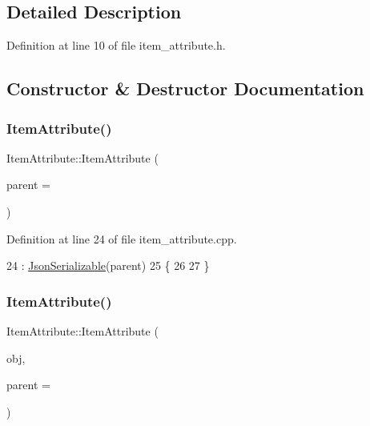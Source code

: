 \subsection{Detailed Description}


Definition at line 10 of file item\+\_\+attribute.\+h.



\subsection{Constructor \& Destructor Documentation}
\mbox{\label{class_item_attribute_a1245a8f1a5bd8e214a249bfadaf3a471}} 
\subsubsection{\texorpdfstring{Item\+Attribute()}{ItemAttribute()}\hspace{0.1cm}{\footnotesize\ttfamily [1/2]}}
{\footnotesize\ttfamily Item\+Attribute\+::\+Item\+Attribute (\begin{DoxyParamCaption}\item[{\hyperlink{class_item}{Item} $\ast$}]{parent = {} }\end{DoxyParamCaption})\hspace{0.3cm}{\ttfamily [explicit]}}



Definition at line 24 of file item\+\_\+attribute.\+cpp.


\begin{DoxyCode}
24                                          : \hyperlink{class_json_serializable_ab5bc08152c95bca5aad8f1a4e2c09998}{JsonSerializable}(parent)
25 \{
26 
27 \}
\end{DoxyCode}
\mbox{\label{class_item_attribute_a934cfe58d341d8a8e0e956e9813ddf71}} 
\subsubsection{\texorpdfstring{Item\+Attribute()}{ItemAttribute()}\hspace{0.1cm}{\footnotesize\ttfamily [2/2]}}
{\footnotesize\ttfamily Item\+Attribute\+::\+Item\+Attribute (\begin{DoxyParamCaption}\item[{Q\+Json\+Object}]{obj,  }\item[{\hyperlink{class_item}{Item} $\ast$}]{parent = {} }\end{DoxyParamCaption})}



